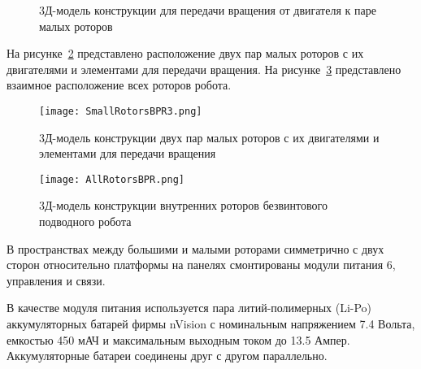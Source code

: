 \begin{figure}[!ht]
	\begin{minipage}[h]{0.5\linewidth}
	\end{minipage}
	\hfill
	\begin{minipage}[h]{0.5\linewidth}
	\end{minipage}
	\caption{3Д-модель конструкции для передачи вращения от двигателя к паре малых роторов}
	\label{SmallRotorsBPR}
\end{figure}

На рисунке~\ref{SmallRotorsBPR3} представлено расположение двух пар малых роторов с их двигателями и элементами для передачи вращения. На рисунке~\ref{AllRotorsBPR} представлено взаимное расположение всех роторов робота.

\begin{figure}[h]
	\centering
	\texttt{[image: SmallRotorsBPR3.png]}%
	\caption{3Д-модель конструкции двух пар малых роторов с их двигателями и элементами для передачи вращения}
	\label{SmallRotorsBPR3}
\end{figure}

\begin{figure}[h]
	\centering
	\texttt{[image: AllRotorsBPR.png]}%
	\caption{3Д-модель конструкции внутренних роторов безвинтового подводного робота}
	\label{AllRotorsBPR}
\end{figure}



В пространствах между большими и малыми роторами симметрично с двух сторон относительно платформы на панелях смонтированы модули питания 6, управления и связи.

В качестве модуля питания используется пара литий-полимерных (Li-Po) аккумуляторных батарей фирмы nVision %
с номинальным напряжением 7.4 Вольта, емкостью 450 мАЧ и максимальным выходным током до 13.5 Ампер. Аккумуляторные батареи соединены друг с другом параллельно.





